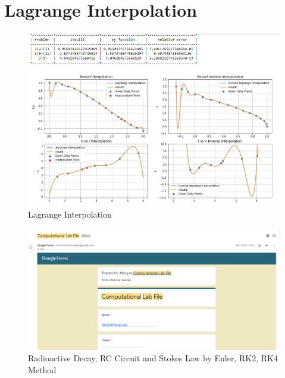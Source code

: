 \documentclass{article}
\begin{document}
\section{Lagrange Interpolation}


\newpage
\begin{figure}[h]
    \centering
    \includegraphics[width=15cm,height=12cm \textwidth]{Lagrange_Interpolation/Capture.PNG}
\caption{Lagrange Interpolation}
\end{figure}

\newpage
\begin{figure}[h]
    \centering
    \includegraphics[width=14cm,height=12cm \textwidth]{4.PNG}
\caption{Radioactive Decay, RC Circuit and Stokes Law by Euler, RK2, RK4 Method}
\end{figure}
\end{document}
